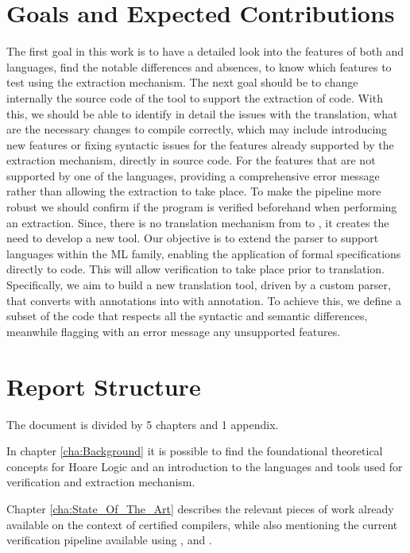 \section{Goals and Expected Contributions}
\label{sec:Goals_and_Expected_Contributions}

The first goal in this work is to have a detailed look into the features of both \ocaml and \cml languages, find the notable 
differences and absences, to know which features to test using the extraction mechanism. The next goal should be to change 
internally the source code of the \cameleer tool to support the extraction of \cml code. With this, we should be able to identify
in detail the issues with the translation, what are the necessary changes to compile correctly, which may include introducing new features
or fixing syntactic issues for the features already supported by the extraction mechanism, directly in \whythree source code.
For the features that are not supported by one of the languages, providing a comprehensive error message rather than allowing 
the extraction to take place. To make the pipeline more robust we should confirm if the program is verified beforehand when performing 
an extraction. Since, there is no translation mechanism from \cml to \ocaml, it creates the need to develop a new tool. Our objective is 
to extend the \gospel parser to support languages within the ML family, enabling the application of formal specifications directly to 
\cml code. This will allow verification to take place prior to translation. Specifically, we aim to build a new translation tool, 
driven by a custom parser, that converts \cml with \gospel annotations into \ocaml with \gospel annotation. To achieve this, we define
a subset of the \cml code that respects all the syntactic and semantic differences, meanwhile flagging with an error message any 
unsupported features.

\section{Report Structure}
\label{sec:Report_Structure}

The document is divided by 5 chapters and 1 appendix. 

In chapter \ref{cha:Background} it is possible to find the foundational theoretical concepts for Hoare Logic and an introduction to 
the languages and tools used for verification and extraction mechanism.

Chapter \ref{cha:State_Of_The_Art} describes the relevant pieces of work already available on the context of certified compilers, 
while also mentioning the current verification pipeline available using \cameleer, \whythree and \cml. 


